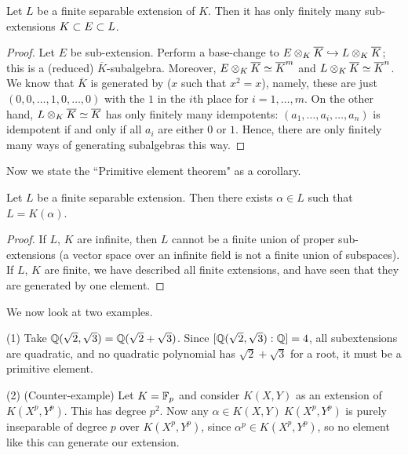 \begin{dfn}
\begin{dfn}
\begin{thm}
Let $L$ be a finite separable extension of $K$.
Then it has only finitely many sub-extensions $K \subset E \subset L$.
\end{thm}
\begin{proof}
Let $E$ be sub-extension. 
Perform a base-change to $E \otimes_{K} \overline{K} \hookrightarrow L \otimes_{K} \overline{K}$; this is a (reduced) $\overline{K}$-subalgebra.
Moreover, $E \otimes_{K} \overline{K} \simeq \overline{K}^m$ and $L \otimes_{K} \overline{K} \simeq \overline{K}^n$.
We know that $\overline{K}$ is generated by  ($x$ such that $x^2 = x$), namely, these are just $(0, 0, \dotsc, 1, 0, \dotsc, 0)$ with the $1$ in the $i$th place for $i = 1, \dotsc, m$.
On the other hand, $L \otimes_{K} \overline{K} \simeq \overline{K}$ has only finitely many idempotents: $(a_1, \dotsc, a_i, \dotsc, a_n)$ is idempotent if and only if all $a_i$ are either $0$ or $1$.
Hence, there are only finitely many ways of generating subalgebras this way.
\end{proof}

Now we state the ``Primitive element theorem" as a corollary.

\begin{cor}
Let $L$ be a finite separable extension.
Then there exists $\alpha \in L$ such that $L = K(\alpha)$.
\end{cor}
\begin{proof}
If $L$, $K$ are infinite, then $L$ cannot be a finite union of proper sub-extensions (a vector space over an infinite field is not a finite union of subspaces).
If $L$, $K$ are finite, we have described all finite extensions, and have seen that they are generated by one element.
\end{proof}

We now look at two examples.

\begin{ex}
(1) Take $\mathbb{Q}(\sqrt{2}, \sqrt{3}) = \mathbb{Q}(\sqrt{2} + \sqrt{3})$. Since $[\mathbb{Q}(\sqrt{2}, \sqrt{3}) : \mathbb{Q} ] = 4$, all subextensions are quadratic, and no quadratic polynomial has $\sqrt{2} + \sqrt{3}$ for a root, it must be a primitive element.

(2) (Counter-example) Let $K = \mathbb{F}_p$ and consider $K(X, Y)$ as an extension of $K(X^p, Y^p)$.
This has degree $p^2$.
Now any $\alpha \in K(X, Y) \ K(X^p, Y^p)$ is purely inseparable of degree $p$ over $K(X^p, Y^p)$, since $\alpha^p \in K(X^p, Y^p)$, so no element like this can generate our extension.
\end{ex}


\end{dfn}
\end{dfn}
